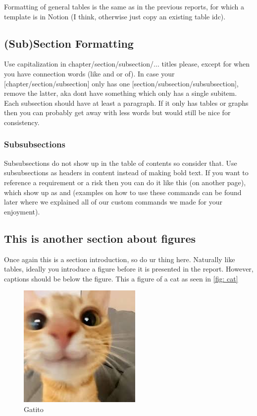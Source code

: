 \documentclass[../main.tex]{subfiles}
\begin{document}
Formatting of general tables is the same as in the previous reports, for which a template is in Notion (I think, otherwise just copy an existing table idc).

\subsection{(Sub)Section Formatting}
Use capitalization in chapter/section/subsection/... titles please, except for when you have connection words (like and or of). In case your [chapter/section/subsection] only has one [section/subsection/subsubsection], remove the latter, aka dont have something which only has a single subitem. Each subsection should have at least a paragraph. If it only has tables or graphs then you can probably get away with less words but would still be nice for consistency. 

\subsubsection{Subsubsections}
Subsubsections do not show up in the table of contents so consider that. Use subsubsections as headers in content instead of making bold text. If you want to reference a requirement or a risk then you can do it like this (on another page), which show up as  and  (examples on how to use these commands can be found later where we explained all of our custom commands we made for your enjoyment).

\subsection{This is another section about figures}
Once again this is a section introduction, so do ur thing here. Naturally like tables, ideally you introduce a figure before it is presented in the report. However, captions should be below the figure. This a figure of a cat as seen in \autoref{fig: cat}
\begin{figure}[ht]
    \centering
    \includegraphics[width=0.25\linewidth]{figures/cats/cat.png}
    \caption{Gatito}%
    \label{fig: cat}
\end{figure}
\end{document}
